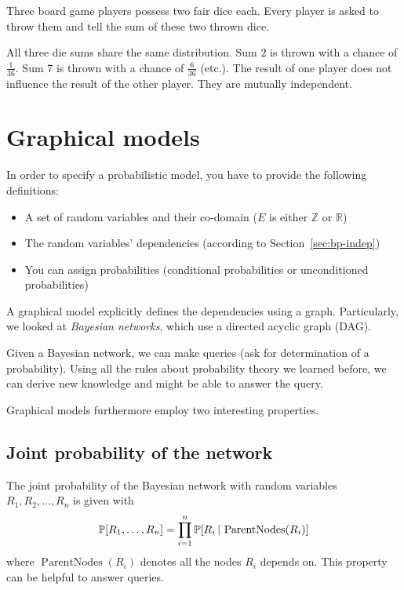 \begin{example}
  Three board game players possess two fair dice each.
  Every player is asked to throw them and tell the sum of these two thrown dice.

  All three die sums share the same distribution.
  Sum $2$ is thrown with a chance of $\frac{1}{36}$.
  Sum $7$ is thrown with a chance of $\frac{6}{36}$ (etc.).
  The result of one player does not influence the result of the other player.
  They are mutually independent.
\end{example}

\section{Graphical models}
\label{sec:gm}
%
In order to specify a probabilistic model, you have to provide the following definitions:
\begin{itemize}
  \item A set of random variables and their co-domain ($E$ is either $\mathbb Z$ or $\mathbb R$)
  \item The random variables' dependencies (according to Section~\ref{sec:bp-indep})
  \item You can assign probabilities (conditional probabilities or unconditioned probabilities)
\end{itemize}
%
A graphical model explicitly defines the dependencies using a graph.
Particularly, we looked at \emph{Bayesian networks}, which use a directed acyclic graph (DAG).

Given a Bayesian network, we can make queries (ask for determination of a probability).
Using all the rules about probability theory we learned before, we can derive new knowledge
and might be able to answer the query.

Graphical models furthermore employ two interesting properties.

\subsection{Joint probability of the network}
\label{sec:gm-joint-prob}
%
The joint probability of the Bayesian network with random variables $R_1, R_2, \ldots, R_n$ is given with
\[ \mathbb P[R_1, \ldots, R_n] = \prod_{i=1}^n \mathbb P[R_i\,|\,\operatorname{ParentNodes}(R_i)] \]
where $\operatorname{ParentNodes}(R_i)$ denotes all the nodes $R_i$ depends on.
This property can be helpful to answer queries.

